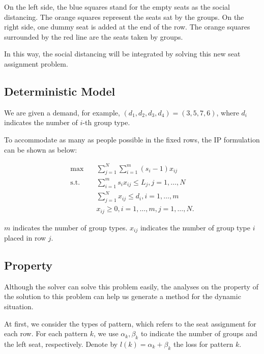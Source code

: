 On the left side, the blue squares stand for the empty seats as the social distancing. The orange squares represent the seats sat by the groups. 
On the right side, one dummy seat is added at the end of the row. The orange squares surrounded by the red line are the seats taken by groups.

In this way, the social distancing will be integrated by solving this new seat assignment problem.


\subsection{Deterministic Model}
We are given a demand, for example, $(d_1, d_2, d_3, d_4) = (3,5,7,6)$, where $d_i$ indicates the number of $i$-th group type.

To accommodate as many as people possible in the fixed rows, the IP formulation can be shown as below:

\begin{equation}\label{deter_upper}
    \begin{aligned}
      \max \quad & \sum_{j =1}^{N} \sum_{i = 1}^{m} (s_i -1) x_{ij} \\
      \text {s.t.} \quad & \sum_{i = 1}^{m} s_i x_{ij} \leq L_{j}, j=1,\ldots,N \\
      & \sum_{j =1}^{N} x_{ij} \leq d_{i}, i=1,\ldots,m \\
      & x_{ij} \geq 0, i=1,\ldots,m, j=1,\ldots,N.
    \end{aligned}
\end{equation}

$m$ indicates the number of group types. $x_{ij}$ indicates the number of group type $i$ placed in row $j$.

\subsection{Property}
Although the solver can solve this problem easily, the analyses on the property of the solution to this problem can help us generate a method for the dynamic situation. 

At first, we consider the types of pattern, which refers to the seat assignment for each row. For each pattern $k$, we use $\alpha_k, \beta_k$ to indicate the number of groups and the left seat, respectively. Denote by $l(k) = \alpha_k + \beta_k$ the loss for pattern $k$.

